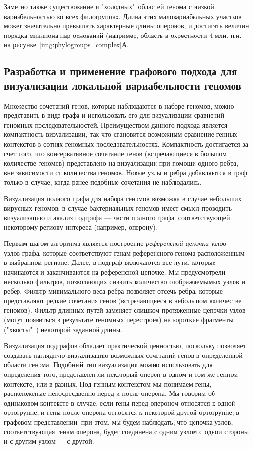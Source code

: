 Заметно также существование и "холодных"\ областей генома с низкой вариабельностью во всех филогруппах. Длина этих маловариабельных участков может значительно превышать характерные длины оперонов, и достигать величин порядка миллиона пар оснований (например, область в окрестности 4 млн. п.н. на рисунке~\ref{img:phylogroups_complex}А.

\subsection*{Разработка и применение графового подхода для визуализации локальной вариабельности геномов}

Множество сочетаний генов, которые наблюдаются в наборе геномов, можно представить в виде графа и использовать его для визуализации сравнений геномных последовательностей. Преимуществом данного подхода является компактность визуализации, так что становится возможным сравнение генных контекстов в сотнях геномных последовательностях. Компактность достигается за счет того, что консервативное сочетание генов (встречающиеся в большом количестве геномов) представлено на визуализации при помощи одного ребра, вне зависимости от количества геномов. Новые узлы и ребра добавляются в граф только в случае, когда ранее подобные сочетания не наблюдались. 

Визуализация полного графа для набора геномов возможна в случае небольших вирусных геномов; в случае бактериальных геномов имеет смысл проводить визуализацию и анализ подграфа --- части полного графа, соответствующей некоторому региону интереса (например, оперону).

Первым шагом алгоритма является построение \textit{референсной цепочки узлов} --- узлов графа, которые соответствуют генам референсного генома расположенным в выбранном регионе. Далее, в подграф включаются все пути, которые начинаются и заканчиваются на референсной цепочке. Мы предусмотрели несколько фильтров, позволяющих снизить количество отображаемымых узлов и ребер. Фильтр минимального веса ребра позволяет отсечь ребра, которые представляют редкие сочетания генов (встречающиеся в небольшом количестве геномов). Фильтр длинных путей заменяет слишком протяженные цепочки узлов (могут появиться в результате геномных перестроек) на короткие фрагменты ("хвосты"\ ) некоторой заданной длины. 

Визуализация подграфов обладает практической ценностью, поскольку позволяет создавать наглядную визуализацию возможных сочетаний генов в определенной области генома. Подобный тип визуализации можно использовать для определения того, представлен ли некоторый оперон в одном и том же генном контексте, или в разных. Под генным контекстом мы понимаем гены, расположеные непосресдвенно перед и после оперона. Мы говорим об одинаковом контексте в случае, если гены перед опероном относятся к одной ортогруппе, и гены после оперона относятся к некоторой другой ортогруппе; в графовом представлении, при этом, мы будем наблюдать, что цепочка узлов, соответствующая генам оперона, будет соединена с одним узлом с одной стороны и с другим узлом --- с другой. 


